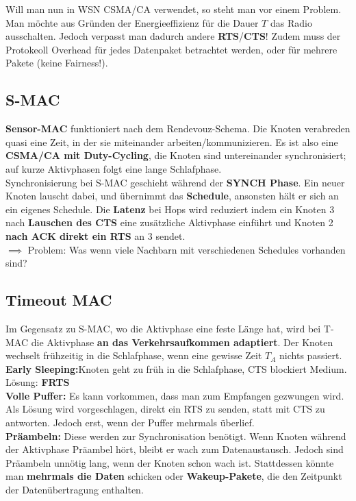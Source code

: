 \documentclass[a4paper]{article}
\begin{document}
Will man nun in WSN CSMA/CA verwendet, so steht man vor einem Problem. Man möchte aus Gründen der Energieeffizienz für die Dauer $T$ das Radio ausschalten. Jedoch verpasst man dadurch andere \textbf{RTS}/\textbf{CTS}! Zudem muss der Protokeoll Overhead für jedes Datenpaket betrachtet werden, oder für mehrere Pakete (keine Fairness!).

\subsection{S-MAC}
\textbf{Sensor-MAC} funktioniert nach dem Rendevouz-Schema. Die Knoten verabreden quasi eine Zeit, in der sie miteinander arbeiten/kommunizieren. Es ist also eine \textbf{CSMA/CA mit Duty-Cycling}, die Knoten sind untereinander synchronisiert; auf kurze Aktivphasen folgt eine lange Schlafphase.\\

Synchronisierung bei S-MAC geschieht während der \textbf{SYNCH Phase}. Ein neuer Knoten lauscht dabei, und übernimmt das \textbf{Schedule}, ansonsten hält er sich an ein eigenes Schedule. Die \textbf{Latenz} bei Hops wird reduziert indem ein Knoten 3 nach \textbf{Lauschen des CTS} eine zusätzliche Aktivphase einführt und Knoten 2 \textbf{nach ACK direkt ein RTS} an 3 sendet.\\

$\implies$ Problem: Was wenn viele Nachbarn mit verschiedenen Schedules vorhanden sind?

\subsection{Timeout MAC}
Im Gegensatz zu S-MAC, wo die Aktivphase eine feste Länge hat, wird bei T-MAC die Aktivphase \textbf{an das Verkehrsaufkommen adaptiert}. Der Knoten wechselt frühzeitig in die Schlafphase, wenn eine gewisse Zeit $T_A$ nichts passiert.\\

\textbf{Early Sleeping:}Knoten geht zu früh in die Schlafphase, CTS blockiert Medium. Lösung: \textbf{FRTS}\\
\textbf{Volle Puffer:} Es kann vorkommen, dass man zum Empfangen gezwungen wird. Als Lösung wird vorgeschlagen, direkt ein RTS zu senden, statt mit CTS zu antworten. Jedoch erst, wenn der Puffer mehrmals überlief.\\

\textbf{Präambeln:} Diese werden zur Synchronisation benötigt. Wenn Knoten während der Aktivphase Präambel hört, bleibt er wach zum Datenaustausch. Jedoch sind Präambeln unnötig lang, wenn der Knoten schon wach ist. Stattdessen könnte man \textbf{mehrmals die Daten} schicken oder \textbf{Wakeup-Pakete}, die den Zeitpunkt der Datenübertragung enthalten.
\end{document}
